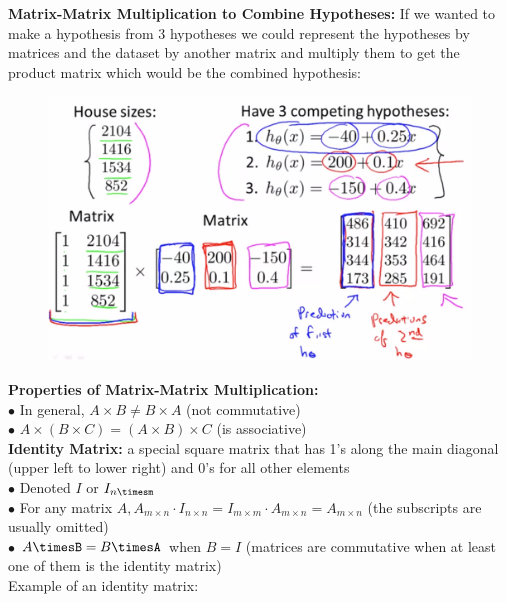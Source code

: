\documentclass{article}
\begin{document}
        \noindent \textbf{Matrix-Matrix Multiplication to Combine Hypotheses:} If we wanted to make a
        hypothesis from 3 hypotheses we could represent the hypotheses by matrices and the dataset by another
        matrix and multiply them to get the product matrix which would be the combined hypothesis:

        \begin{figure}[hbt!]
            \centering
            \includegraphics[scale=0.4]{Resources/Hypothesis_Combination}
        \end{figure}

        \pagebreak
        \noindent \textbf{Properties of Matrix-Matrix Multiplication:} \\
        $\bullet$ In general, $A\times B\not = B\times A$ (not commutative) \\
        $\bullet$ $A\times(B\times C)=(A\times B)\times C$ (is associative) \\

        \noindent \textbf{Identity Matrix:} a special square matrix that has 1's along the main diagonal
        (upper left to lower right) and 0's for all other elements \\
        $\bullet$ Denoted $I$ or $I_{n\timesm}$ \\
        $\bullet$ For any matrix $A,A_{m\times n}\cdot I_{n\times n}=I_{m\times m}\cdot A_{m\times n}=
        A_{m\times n}$ (the subscripts are usually omitted) \\
        $\bullet$ $A\timesB=B\timesA$ when $B=I$ (matrices are commutative when at least one of them is the
        identity matrix) \\

        \noindent Example of an identity matrix:
\end{document}
